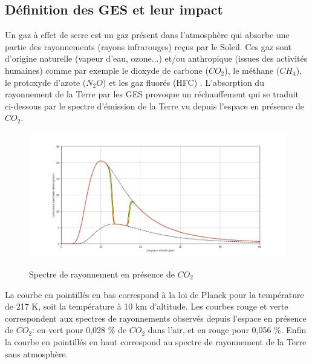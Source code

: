 \documentclass[a4paper, 12pt]{report} %
\newcommand{\figcaptionwithsource}[3]{\caption[#1 
            \newline #2]{#1} \addtocontents{lof}{\protect\vspace{1\baselineskip}}}
\begin{document}
\subsection{Définition des GES et leur impact}

Un gaz à effet de serre est un gaz présent dans l'atmosphère qui 
absorbe une partie des rayonnements (rayons infrarouges) 
reçus par le Soleil. Ces gaz sont d'origine naturelle 
(vapeur d'eau, ozone...) et/ou anthropique 
(issues des activités humaines) comme par exemple le dioxyde 
de carbone ($CO_2$), le méthane ($CH_4$), le protoxyde d'azote
($N_2O$) et les gaz fluorés (HFC) . L'absorption du rayonnement de la Terre par les GES 
provoque un réchauffement qui se traduit ci-dessous par le spectre d'émission de la Terre vu depuis l'espace en présence de $CO_2$.

\begin{figure}[H]
    \begin{center}
    \includegraphics[scale=0.6]{Images/trou.png}
    \figcaptionwithsource{Spectre de rayonnement en présence de $CO_2$}{\url{https://www.youtube.com/watch?v=ewc8FBtEKPs}}{fig:figure1}
    \label{fig:figure1}
    \end{center} 
\end{figure}

La courbe en pointillés en bas correspond à la loi de Planck pour la température de 217 K, soit la température à 10 km d'altitude. Les courbes rouge et verte correspondent aux spectres de rayonnements observés depuis l'espace en présence de $CO_2$: en vert pour 0,028 $\%$ de $CO_2$ dans l'air, et en rouge pour 0,056 $\%$. Enfin la courbe en pointillés en haut correspond au spectre de rayonnement de la Terre sans atmosphère. \vspace{\baselineskip}
\end{document}
